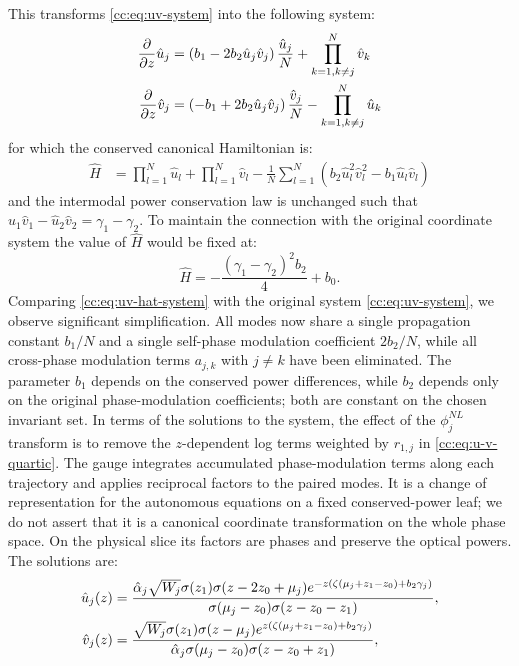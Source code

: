 \documentclass[11pt,a4paper]{article}
\numberwithin{equation}{section}
\begin{document}
This transforms \eqref{cc:eq:uv-system} into the following system:
\begin{align}
\frac{\partial}{\partial z} \hat{u}_j &= \left(b_1 - 2 b_2\hat{u}_j \hat{v}_j \right) \frac{\hat{u}_j}{N} + \prod\limits_{k=1, k \ne j}^{N} \hat{v}_k \notag \\
\frac{\partial}{\partial z} \hat{v}_j &= \left( - b_1 + 2 b_2\hat{u}_j \hat{v}_j\right) \frac{\hat{v}_j}{N} - \prod\limits_{k=1, k \ne j}^{N} \hat{u}_k \label{cc:eq:uv-hat-system}
\end{align}
for which the conserved canonical Hamiltonian is:
\begin{align}
\hat{H} &= \prod_{l=1}^{N} \hat{u}_l + \prod_{l=1}^{N} \hat{v}_l - \frac{1}{N}\sum_{l=1}^{N} \left(b_2 \hat{u}^{2}_l \hat{v}^{2}_l  - b_1 \hat{u}_l \hat{v}_l \right)
\end{align}
and the intermodal power conservation law is unchanged such that $\hat{u}_1 \hat{v}_1 - \hat{u}_2 \hat{v}_2 = \gamma_1 - \gamma_2$. 
To maintain the connection with the original coordinate system the value of $\hat{H}$ would be fixed at:
\begin{equation}
\hat{H} =  - \frac{\left({\gamma}_{1} - {\gamma}_{2}\right)^{2} {b}_{2}}{4} + {b}_{0}.
\end{equation}
Comparing \eqref{cc:eq:uv-hat-system} with the original system \eqref{cc:eq:uv-system}, we observe significant simplification.
All modes now share a single propagation constant $b_1/N$ and a single self-phase modulation coefficient $2b_2/N$, while all cross-phase modulation terms $a_{j,k}$ with $j \ne k$ have been eliminated.
The parameter $b_1$ depends on the conserved power differences, while $b_2$ depends only on the original phase-modulation coefficients; both are constant on the chosen invariant set.
In terms of the solutions to the system, the effect of the $\phi_j^{NL}$ transform is to remove the $z$-dependent log terms weighted by $r_{1,j}$ in \eqref{cc:eq:u-v-quartic}. 
The gauge integrates accumulated phase-modulation terms along each trajectory and applies reciprocal factors to the paired modes.
It is a change of representation for the autonomous equations on a fixed conserved-power leaf; we do not assert that it is a canonical coordinate transformation on the whole phase space.
On the physical slice its factors are phases and preserve the optical powers.
The solutions are:
\begin{align}
\hat{u}_j{\left(z\right)} &= \frac{{\hat{\alpha}}_{j} \sqrt{W_j}\sigma{\left(z_{1}\right)} \sigma{\left(z - 2 z_{0} + {\mu}_{j}\right)} e^{-z\left(\zeta\left(\mu_j + z_1 - z_0\right) + b_2\gamma_j\right)} }{ \sigma{\left({\mu}_{j} - z_{0}\right)} \sigma{\left(z - z_{0} - z_{1}\right)}}, \notag \\
\hat{v}_j{\left(z\right)} &= \frac{\sqrt{W_j}\sigma{\left(z_{1}\right)} \sigma{\left(z - {\mu}_{j}\right)} e^{z\left(\zeta\left(\mu_j + z_1 - z_0\right) + b_2\gamma_j\right)}}{ {\hat{\alpha}}_{j} \sigma{\left({\mu}_{j} - z_{0}\right)} \sigma{\left(z - z_{0} + z_{1}\right)}}, \label{cc:eq:uhat-vhat-gauge-sols}
\end{align}
\end{document}
